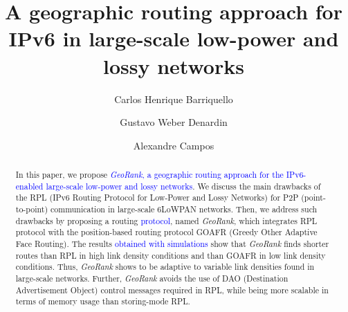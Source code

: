 \documentclass[final,authoryear,3p,twocolumn]{elsarticle}
\newcommand{\removed}[1]{}
\newcommand{\rev}{\textcolor{blue}}
\begin{document}
\begin{frontmatter}



\title{A geographic routing approach for IPv6 in large-scale low-power and lossy networks}



\author[addr1]{Carlos Henrique Barriquello}
\author[addr2]{Gustavo Weber Denardin}
\author[addr1]{Alexandre Campos}
\address[addr1]{Electronic Ballast Researching Group (GEDRE) - Intelligence in Lighting, Federal University of Santa Maria(UFSM), Santa Maria, RS, 97105-900, Brazil}
\address[addr2]{Technological Federal University of Paran$\acute{a}$, Pato Branco, PR, 85503-390, Brazil}


\begin{abstract}
In this paper, we propose\removed{a routing protocol for a smart street lighting system based on IPv6-enabled wireless sensor network} \rev{\textit{GeoRank}, a geographic routing approach for the IPv6-enabled large-scale  low-power and lossy networks}. We discuss the main drawbacks of the RPL (IPv6 Routing Protocol for
Low-Power and Lossy Networks) for P2P (point-to-point) communication in large-scale 6LoWPAN networks. Then, we address such drawbacks by proposing a \removed{new}routing \removed{algorithm}\rev{protocol}, named \textit{GeoRank}, which integrates RPL protocol with the position-based routing protocol GOAFR (Greedy Other Adaptive Face Routing).\removed{Simulations were performed on networks extracted from real street maps.} The\removed{obtained} results \rev{obtained with simulations} show that \textit{GeoRank} finds shorter routes than RPL in high link density conditions and than GOAFR in low link density conditions. Thus, \textit{GeoRank} shows to be adaptive to variable link densities found in large-scale networks. Further, \textit{GeoRank} avoids the use of DAO (Destination Advertisement Object) control messages required in RPL, while being more scalable in terms of memory usage than storing-mode RPL.
\end{abstract}




\end{frontmatter}
\end{document}
